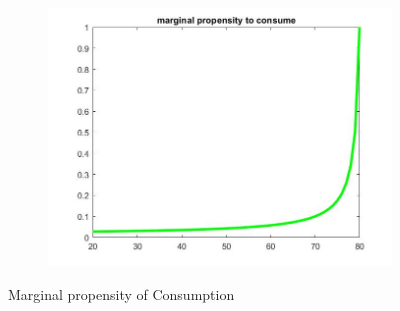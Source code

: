 \documentclass[12pt,a4paper]{article}
\begin{document}
\begin{figure}[h!]
\begin{subfigure}[b]{0.32\linewidth}
    \includegraphics[width=\linewidth]{graphs/Q2/mpc3.jpg}
  \end{subfigure}
  \caption{Marginal propensity of Consumption}
    \label{fig:2}
\end{figure}
\end{document}
